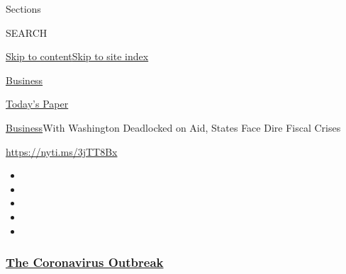 Sections

SEARCH

\protect\hyperlink{site-content}{Skip to
content}\protect\hyperlink{site-index}{Skip to site index}

\href{https://www.nytimes3xbfgragh.onion/section/business}{Business}

\href{https://myaccount.nytimes3xbfgragh.onion/auth/login?response_type=cookie\&client_id=vi}{}

\href{https://www.nytimes3xbfgragh.onion/section/todayspaper}{Today's
Paper}

\href{/section/business}{Business}\textbar{}With Washington Deadlocked
on Aid, States Face Dire Fiscal Crises

\url{https://nyti.ms/3jTT8Bx}

\begin{itemize}
\item
\item
\item
\item
\item
\end{itemize}

\hypertarget{the-coronavirus-outbreak}{%
\subsubsection{\texorpdfstring{\href{https://www.nytimes3xbfgragh.onion/news-event/coronavirus?name=styln-coronavirus-markets\&region=TOP_BANNER\&block=storyline_menu_recirc\&action=click\&pgtype=Article\&impression_id=398e6170-f296-11ea-b172-61b0efec9af7\&variant=undefined}{The
Coronavirus
Outbreak}}{The Coronavirus Outbreak}}\label{the-coronavirus-outbreak}}

